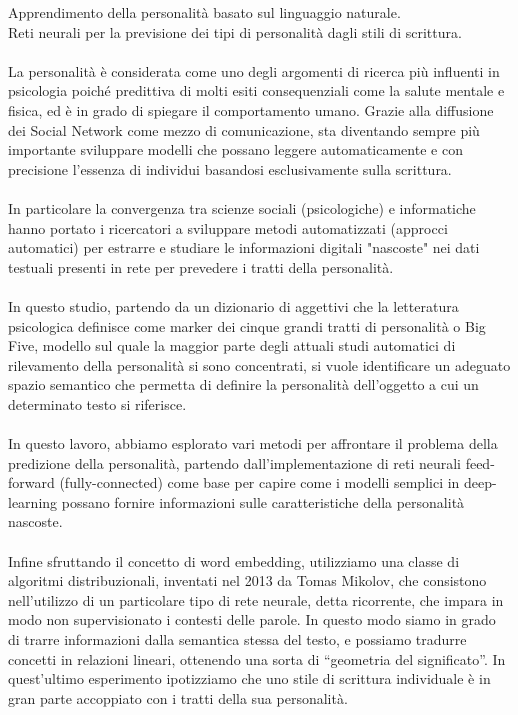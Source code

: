 Apprendimento della personalità basato sul linguaggio naturale. \\
Reti neurali per la previsione dei tipi di personalità dagli stili di scrittura.
\\\\
La personalità è considerata come uno degli argomenti di ricerca più influenti in psicologia poiché predittiva di molti esiti consequenziali come la salute mentale e fisica, ed è in grado di spiegare il comportamento umano.
Grazie alla diffusione dei Social Network come mezzo di comunicazione, sta diventando sempre più importante sviluppare modelli che possano leggere automaticamente e con precisione l'essenza di individui basandosi esclusivamente sulla scrittura. 
\\\\
In particolare la convergenza tra scienze sociali (psicologiche) e informatiche hanno portato i ricercatori a sviluppare metodi automatizzati (approcci automatici) per estrarre e studiare le informazioni digitali "nascoste" nei dati testuali presenti in rete per prevedere i tratti della personalità.
\\\\
In questo studio, partendo da un dizionario di aggettivi che la letteratura psicologica definisce come marker dei cinque grandi tratti di personalità o Big Five, modello sul quale la maggior parte degli attuali studi automatici di rilevamento della personalità si sono concentrati, si vuole identificare un adeguato spazio semantico che permetta di definire la personalità dell'oggetto a cui un determinato testo si riferisce. 
\\\\
In questo lavoro, abbiamo esplorato vari metodi per affrontare il problema della predizione della personalità, partendo dall'implementazione di reti neurali feed-forward (fully-connected) come base per capire come i modelli semplici in deep-learning possano fornire informazioni sulle caratteristiche della personalità nascoste. 
\\\\
Infine sfruttando il concetto di word embedding, utilizziamo una classe di algoritmi distribuzionali, inventati nel 2013 da Tomas Mikolov, che consistono nell'utilizzo di un particolare tipo di rete neurale, detta ricorrente, che impara in modo non supervisionato i contesti delle parole.
In questo modo siamo in grado di trarre informazioni dalla semantica stessa del testo, e possiamo tradurre concetti in relazioni lineari, ottenendo una sorta di “geometria del significato”.
In quest'ultimo esperimento ipotizziamo che uno stile di scrittura individuale è in gran parte accoppiato con i tratti della sua personalità.